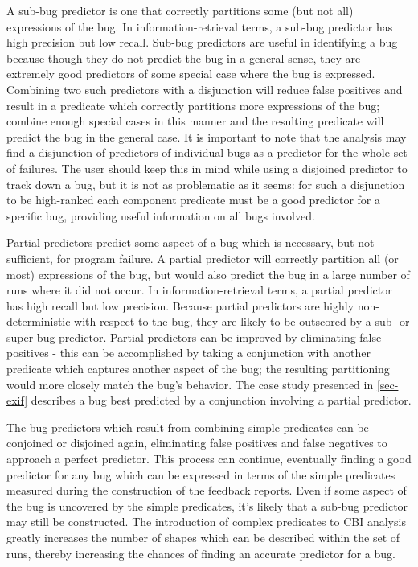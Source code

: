 A sub-bug predictor is one that correctly partitions some (but not all) expressions of the bug.  In information-retrieval terms, a sub-bug predictor has high precision but low recall.  Sub-bug predictors are useful in identifying a bug because though they do not predict the bug in a general sense, they are extremely good predictors of some special case where the bug is expressed.  Combining two such predictors with a disjunction will reduce false positives and result in a predicate which correctly partitions more expressions of the bug; combine enough special cases in this manner and the resulting predicate will predict the bug in the general case.  It is important to note that the analysis may find a disjunction of predictors of individual bugs as a predictor for the whole set of failures.  The user should keep this in mind while using a disjoined predictor to track down a bug, but it is not as problematic as it seems: for such a disjunction to be high-ranked each component predicate must be a good predictor for a specific bug, providing useful information on all bugs involved.

Partial predictors predict some aspect of a bug which is necessary, but not sufficient, for program failure.  A partial predictor will correctly partition all (or most) expressions of the bug, but would also predict the bug in a large number of runs where it did not occur.  In information-retrieval terms, a partial predictor has high recall but low precision.  Because partial predictors are highly non-deterministic with respect to the bug, they are likely to be outscored by a sub- or super-bug predictor.  Partial predictors can be improved by eliminating false positives - this can be accomplished by taking a conjunction with another predicate which captures another aspect of the bug; the resulting partitioning would more closely match the bug's behavior.  The case study presented in \autoref{sec-exif} describes a bug best predicted by a conjunction involving a partial predictor.

The bug predictors which result from combining simple predicates can be conjoined or disjoined again, eliminating false positives and false negatives to approach a perfect predictor.  This process can continue, eventually finding a good predictor for any bug which can be expressed in terms of the simple predicates measured during the construction of the feedback reports.  Even if some aspect of the bug is uncovered by the simple predicates, it's likely that a sub-bug predictor may still be constructed.  The introduction of complex predicates to CBI analysis greatly increases the number of shapes which can be described within the set of runs, thereby increasing the chances of finding an accurate predictor for a bug.
